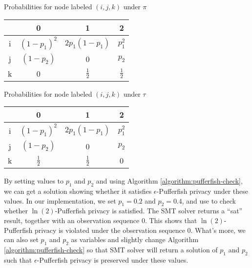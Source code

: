 \begin{minipage}{\textwidth}
\begin{minipage}[t]{0.4\textwidth}
 \centering
  \makeatletter{}\makeatother\caption{Probabilities for node labeled $(i,j,k)$ under $\pi$ }
  \label{table:pi}
   \begin{tabular}{c|ccc}
& 0 & 1 & 2 \\
      \hline
      i
      & $(1-p_1)^2$
      & $2p_1(1-p_1)$
      & $p_1^2$
      \\
      j
      & $(1-p_2)$
      & 0
      & $p_2$
      \\
      k
      & 0
      & $\frac{1}{2}$
      & $\frac{1}{2}$
\end{tabular}
\end{minipage}
\begin{minipage}[t]{0.2\textwidth}
\centering
\space
\end{minipage}
\begin{minipage}[t]{0.4\textwidth}
\centering
  \makeatletter{}\makeatother\caption{Probabilities for node labeled $(i,j,k)$ under $\tau$ }
  \label{table:tau}

   \begin{tabular}{c|ccc}
& 0 & 1 & 2 \\
      \hline
      i
      & $(1-p_1)^2$
      & $2p_1(1-p_1)$
      & $p_1^2$
      \\
      j
      & $(1-p_2)$
      & 0
      & $p_2$
      \\
      k
      & $\frac{1}{2}$
      & $\frac{1}{2}$
      & 0
\end{tabular}
\end{minipage}
\end{minipage}

By setting values to $p_1$ and $p_2$ and using Algorithm \ref{algorithm:pufferfish-check}, we can get a solution
showing whether it satisfies $\epsilon$-Pufferfish privacy under these values.
In our implementation, we set $p_1 = 0.2$ and $p_2 = 0.4$, and use \zpython to check whether
$\ln(2)$-Pufferfish privacy is satisfied. The SMT solver returns a ``sat'' result, together with an observation
sequence $0$. This shows that $\ln(2)$-Pufferfish privacy is violated under the observation sequence $0$.
What's more, we can also set $p_1$ and $p_2$ as variables and slightly change Algorithm \ref{algorithm:pufferfish-check}
so that SMT solver will return a solution of $p_1$ and $p_2$ such that $\epsilon$-Pufferfish privacy
is preserved under these values.

